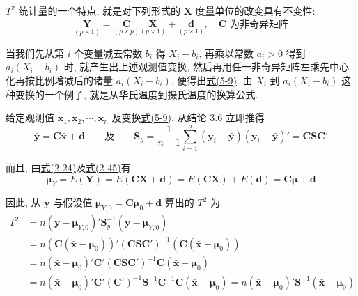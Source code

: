 $T^2$ 统计量的一个特点, 就是对下列形式的 $\mathbf{X}$ 度量单位的改变具有不变性:
\label{eq:5-9}
\begin{equation}
\underset{(p\times 1)}{\mathbf{Y}}=\underset{(p\times p)}{\mathbf{C}}\underset{(p\times 1)}{\mathbf{X}}+\underset{(p\times 1)}{\mathbf{d}},\quad \mathbf{C}\text{ 为非奇异矩阵} \tag{5-9}
\end{equation}

当我们先从第 $i$ 个变量减去常数 $b_i$ 得 $X_i-b_i$, 再乘以常数 $a_i>0$ 得到 $a_i(X_i-b_i)$ 时, 就产生出上述观测值变换, 然后再用任一非奇异矩阵左乘先中心化再按比例增减后的诸量 $a_i(X_i-b_i)$, 便得出\hyperref[eq:5-9]{式(5-9)}. 由 $X_i$ 到 $a_i(X_i-b_i)$ 这种变换的一个例子, 就是从华氏温度到摄氏温度的换算公式.

给定观测值 $\mathbf{x}_1,\mathbf{x}_2,\cdots,\mathbf{x}_n$ 及变换\hyperref[eq:5-9]{式(5-9)}, 从结论 3.6 立即推得
\[
\bar{\mathbf{y}}=\mathbf{C}\bar{\mathbf{x}}+\mathbf{d}\qquad\text{及}\qquad \mathbf{S}_y=\frac{1}{n-1}\sum_{i=1}^{n}(\mathbf{y}_i-\bar{\mathbf{y}})(\mathbf{y}_i-\bar{\mathbf{y}})'=\mathbf{C}\mathbf{S}\mathbf{C}'
\]

而且, 由\hyperref[eq:2-24]{式(2-24)}及\hyperref[eq:2-45]{式(2-45)}有
\[
\boldsymbol{\mu}_Y=E(\mathbf{Y})=E(\mathbf{C}\mathbf{X}+\mathbf{d})=E(\mathbf{C}\mathbf{X})+E(\mathbf{d})=\mathbf{C}\boldsymbol{\mu}+\mathbf{d}
\]

因此, 从 $\mathbf{y}$ 与假设值 $\boldsymbol{\mu}_{Y,0}=\mathbf{C}\boldsymbol{\mu}_0+\mathbf{d}$ 算出的 $T^2$ 为
\begin{align*}
T^2&=n(\mathbf{y}-\boldsymbol{\mu}_{Y,0})'\mathbf{S}_y^{-1}(\mathbf{y}-\boldsymbol{\mu}_{Y,0})\\
&=n(\mathbf{C}(\bar{\mathbf{x}}-\boldsymbol{\mu}_0))'(\mathbf{C}\mathbf{S}\mathbf{C}')^{-1}(\mathbf{C}(\bar{\mathbf{x}}-\boldsymbol{\mu}_0))\\
&=n(\bar{\mathbf{x}}-\boldsymbol{\mu}_0)'\mathbf{C}'(\mathbf{C}\mathbf{S}\mathbf{C}')^{-1}\mathbf{C}(\bar{\mathbf{x}}-\boldsymbol{\mu}_0)\\
&=n(\bar{\mathbf{x}}-\boldsymbol{\mu}_0)'\mathbf{C}'(\mathbf{C}')^{-1}\mathbf{S}^{-1}\mathbf{C}^{-1}\mathbf{C}(\bar{\mathbf{x}}-\boldsymbol{\mu}_0)=n(\bar{\mathbf{x}}-\boldsymbol{\mu}_0)'\mathbf{S}^{-1}(\bar{\mathbf{x}}-\boldsymbol{\mu}_0)
\end{align*}
